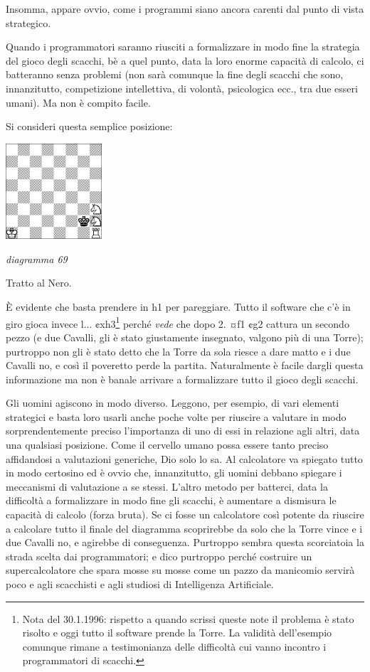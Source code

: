 \documentclass[
]{article}
\begin{document}
Insomma, appare ovvio, come i programmi siano ancora carenti dal punto
di vista strategico.

Quando i programmatori saranno riusciti a formalizzare in modo fine la
strategia del gioco degli scacchi, bè a quel punto, data la loro enorme
capacità di calcolo, ci batteranno senza problemi (non sarà comunque la
fine degli scacchi che sono, innanzitutto, competizione intellettiva, di
volontà, psicologica ecc., tra due esseri umani). Ma non è compito
facile.

Si consideri questa semplice posizione:

\includegraphics[width=1.40139in,height=1.40139in]{vertopal_109f12be458a423d8f3cc838880eaea2/media/image69.png}

\emph{diagramma 69}

Tratto al Nero.

È evidente che basta prendere in h1 per pareggiare. Tutto il software
che c'è in giro gioca invece l... ¢xh3\footnote{Nota del 30.1.1996:
  rispetto a quando scrissi queste note il problema è stato risolto e
  oggi tutto il software prende la Torre. La validità dell'esempio
  comunque rimane a testimonianza delle difficoltà cui vanno incontro i
  programmatori di scacchi.} perché \emph{vede} che dopo 2. ¤f1 ¢g2
cattura un secondo pezzo (e due Cavalli, gli è stato giustamente
insegnato, valgono più di una Torre); purtroppo non gli è stato detto
che la Torre da sola riesce a dare matto e i due Cavalli no, e così il
poveretto perde la partita. Naturalmente è facile dargli questa
informazione ma non è banale arrivare a formalizzare tutto il gioco
degli scacchi.

Gli uomini agiscono in modo diverso. Leggono, per esempio, di vari
elementi strategici e basta loro usarli anche poche volte per riuscire a
valutare in modo sorprendentemente preciso l'importanza di uno di essi
in relazione agli altri, data una qualsiasi posizione. Come il cervello
umano possa essere tanto preciso affidandosi a valutazioni generiche,
Dio solo lo sa. Al calcolatore va spiegato tutto in modo certosino ed è
ovvio che, innanzitutto, gli uomini debbano spiegare i meccanismi di
valutazione a se stessi. L'altro metodo per batterci, data la difficoltà
a formalizzare in modo fine gli scacchi, è aumentare a dismisura le
capacità di calcolo (forza bruta). Se ci fosse un calcolatore così
potente da riuscire a calcolare tutto il finale del diagramma
scoprirebbe da solo che la Torre vince e i due Cavalli no, e agirebbe di
conseguenza. Purtroppo sembra questa scorciatoia la strada scelta dai
programmatori; e dico purtroppo perché costruire un supercalcolatore che
spara mosse su mosse come un pazzo da manicomio servirà poco e agli
scacchisti e agli studiosi di Intelligenza Artificiale.
\end{document}
